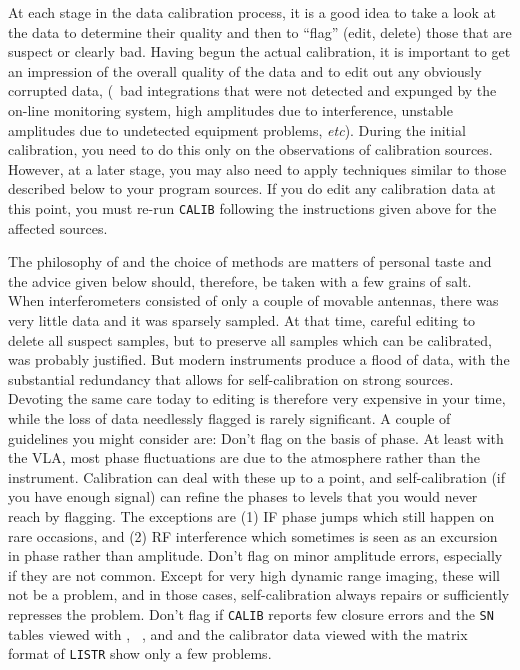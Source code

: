 
     At each stage in the data calibration process, it is a good idea
to take a look at the data to determine their quality and then to
``flag'' (edit, delete) those that are suspect or clearly bad.  Having
begun the actual calibration, it is important to get an impression
of the overall quality of the data and to edit out any obviously
corrupted data, (\eg\ bad integrations that were not detected and
expunged by the on-line monitoring system, high amplitudes due to
interference, unstable amplitudes due to undetected equipment
problems, {\it etc\/}).  During the initial calibration, you need to
do this only on the observations of calibration sources.  However, at
a later stage, you may also need to apply techniques similar to those
described below to your program sources.  If you do edit any
calibration data at this point, you must re-run {\tt CALIB} following
the instructions given above for the affected sources.

     The philosophy of  and the choice of methods are
matters of personal taste and the advice given below should,
therefore, be taken with a few grains of salt.  When interferometers
consisted of only a couple of movable antennas, there was very little
data and it was sparsely sampled.  At that time, careful editing to
delete all suspect samples, but to preserve all samples which can be
calibrated, was probably justified.  But modern instruments produce a
flood of data, with the substantial redundancy that allows for
self-calibration on strong sources.  Devoting the same care today to
editing is therefore very expensive in your time, while the loss of
data needlessly flagged is rarely significant.  A couple of guidelines
you might consider are:
\xbit
\Item Don't flag on the basis of phase.  At least with the VLA,
    most phase fluctuations are due to the atmosphere rather than the
    instrument.  Calibration can deal with these up to a point, and
    self-calibration (if you have enough signal) can refine the phases
    to levels that you would never reach by flagging.  The exceptions
    are (1) IF phase jumps which still happen on rare occasions, and
    (2) RF interference which sometimes is seen as an excursion in
    phase rather than amplitude.
\Item Don't flag on minor amplitude errors, especially if they are
    not common.  Except for very high dynamic range imaging, these
    will not be a problem, and in those cases, self-calibration always
    repairs or sufficiently represses the problem.
\Item Don't flag if {\tt CALIB} reports few closure errors and the
    {\tt SN} tables viewed with {\tt {}}, {\tt
    }, and {\tt {}} and the calibrator data
    viewed with the matrix format of {\tt LISTR} show only a few
    problems.
\xeit

